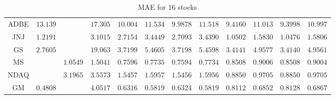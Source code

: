 \documentclass[12pt, A4]{article}
\begin{document}
\begin{landscape}
\begin{table}[H]
\begin{center}
\begin{tabular}{| c | c | c | c | c | c | c | c | c | c | c | c |}
				ADBE & $13.139$ & \cellcolor{blue!25}  \boldmath{$3.8107$} & $17.305$ & $10.004$ & $11.534$ & $9.9878$ & $11.518$ & $9.4160$ & $11.013$ & $9.3998$ & $10.997$\\ \cline{1-12}
				JNJ & $1.2191$ & \cellcolor{blue!25}  \boldmath{$0.9451$} & $3.1015$ & $2.7154$ & $3.4449$ & $2.7093$ & $3.4390$ & $1.0502$ & $1.5830$ & $1.0476$ & $1.5806$\\ \cline{1-12}
				GS & $2.7605$ & \cellcolor{blue!25} \boldmath{$2.4998$} & $19.063$ & $3.7199$ & $5.4605$ & $3.7198$ & $5.4598$ & $3.4141$ & $4.9577$ & $3.4140$ & $4.9561$\\ \cline{1-12}
				MS & \cellcolor{blue!25}  \boldmath{$0.5662$} & $1.0549$ & $1.5041$ & $0.7596$ & $0.7735$ & $0.7594$ & $0.7734$ & $0.8508$ & $0.9006$ & $0.8508$ & $0.9004$\\ \cline{1-12}
				NDAQ & \cellcolor{blue!25}  \boldmath{$0.7829$} & $3.1965$ & $3.5573$ & $1.5457$ & $1.5957$ & $1.5456$ & $1.5956$ & $0.8850$ & $0.9705$ & $0.8850$ & $0.9705$\\ \cline{1-12}
				GM & $0.4808$ &\cellcolor{blue!25}  \boldmath{$0.4110$} & $4.0517$ & $0.6316$ & $0.5819$ & $0.6324$ & $0.5819$ & $0.8112$ & $0.6852$ & $0.8128$ & $0.6867$\\ \cline{1-12}
			\end{tabular}
			\caption{MAE for $16$ stocks} \label{stocks MAE_results}
		\end{center}
	\end{table}
\end{landscape}
\end{document}
